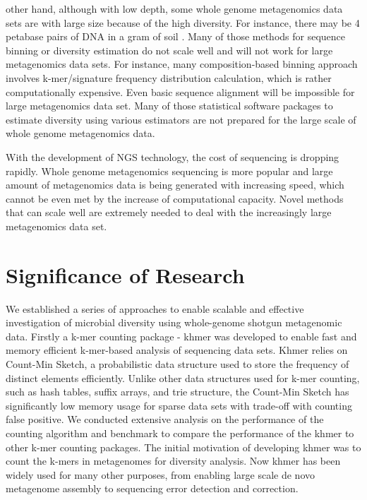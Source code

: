 other hand, although with low depth, some whole genome metagenomics data sets
are with large size because of the high diversity. For instance, there may be 4
petabase pairs of DNA in a gram of soil \cite{Zarraonaindia:2013aa}. Many of
those methods for sequence binning or diversity estimation do not scale well
and will not work for large metagenomics data sets. For instance, many
composition-based binning approach involves k-mer/signature frequency
distribution calculation, which is rather computationally expensive. Even basic
sequence alignment will be impossible for large metagenomics data set. Many of
those statistical software packages to estimate diversity using various
estimators are not prepared for the large scale of whole genome metagenomics
data.

With the development of NGS technology, the cost of sequencing is dropping
rapidly. Whole genome metagenomics sequencing is more popular and large amount
of metagenomics data is being generated with increasing speed, which cannot be
even met by the increase of computational capacity. Novel methods that can
scale well are extremely needed to deal with the increasingly large
metagenomics data set.


\section{Significance of Research}

We established a series of approaches to enable scalable and effective
investigation of microbial diversity using whole-genome shotgun metagenomic
data. Firstly a k-mer counting package - khmer was developed to enable fast and
memory efficient k-mer-based analysis of sequencing data sets\cite{Zhang2014,khmer}. Khmer relies on 
Count-Min Sketch, a probabilistic data structure used to store the frequency of 
distinct elements efficiently. Unlike other data structures used for k-mer 
counting, such as hash tables, suffix arrays, and trie structure, the Count-Min
Sketch has significantly low memory usage for sparse data sets with trade-off 
with counting false positive. We conducted extensive analysis on the
performance of the counting algorithm and benchmark to compare the performance
of the khmer to other k-mer counting packages. The initial motivation of
developing khmer was to count the  k-mers in metagenomes for diversity
analysis. Now khmer has been widely used for many other purposes, from enabling
large scale de novo metagenome assembly  to sequencing error detection and
correction.

